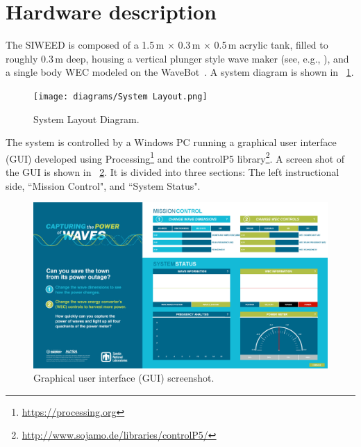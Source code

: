 \documentclass[11pt, letterpaper]{article}
\begin{document}
\section{Hardware description} %
The SIWEED is composed of a 1.5\,m $\times{}$ 0.3\,m $\times{}$ 0.5\,m acrylic tank, filled to roughly 0.3\,m deep, housing a vertical plunger style wave maker (see, e.g., \cite{hyun1976simplified}), and a single body WEC modeled on the WaveBot~\cite{Coe2016a}.
A system diagram is shown in \figurename~\ref{fig:siweed_layout}.
\begin{figure}[tb]
  \centering
  \texttt{[image: diagrams/System Layout.png]}
  \caption{System Layout Diagram.}
  \label{fig:siweed_layout}
\end{figure}
The system is controlled by a Windows PC running a graphical user interface (GUI) developed using Processing\footnote{\url{https://processing.org}} and the controlP5 library\footnote{\url{http://www.sojamo.de/libraries/controlP5/}}.
A screen shot of the GUI is shown in \figurename~\ref{fig:siweed_guiScreenShot}.
It is divided into three sections: The left instructional side, ``Mission Control", and ``System Status".

\begin{figure}[tb]
  \centering
  \includegraphics[width=1\textwidth]{diagrams/siweed_guiScreenShot.png}
  \caption{Graphical user interface (GUI) screenshot.}
  \label{fig:siweed_guiScreenShot}
\end{figure}
\end{document}
